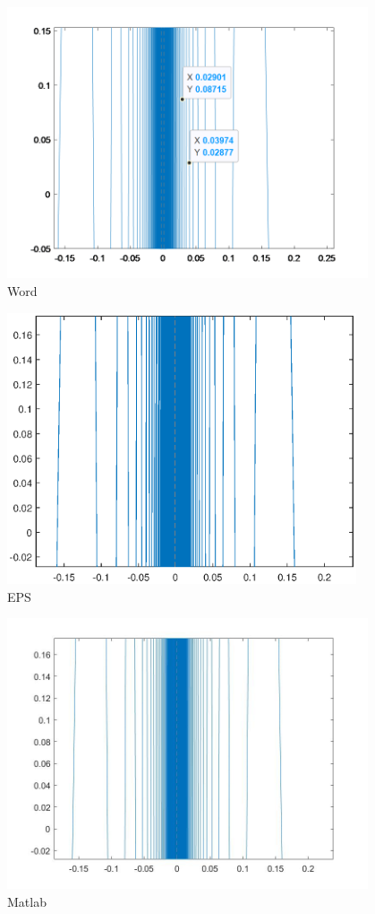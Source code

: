 \documentclass[12pt,a4paper]{article}
\begin{document}
\begin{figure}[H] %
	\centering %
	\includegraphics[height=8cm]{./word.png}
	\caption{Word} %
\end{figure}

\begin{figure}[H] %
	\centering %
	\includegraphics[height=8cm]{./eps.eps}
	\caption{EPS} %
\end{figure}

\begin{figure}[H] %
	\centering %
	\includegraphics[height=8cm]{./jpg.jpg}
	\caption{Matlab} %
\end{figure}
\end{document}
